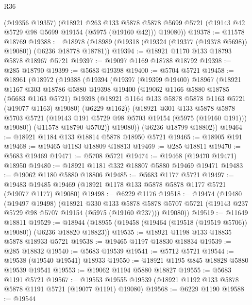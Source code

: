 \begin{lexlean}{R36}
\begin{coremodule}
      (@19356 @19357)
      (@18921
        @263
        @133
        @5878
        @5878
        @5699
        @5721
        (@19143 @42 @5729 @98 @5699 @19154 (@5975 (@19160 @42)))
        @19080))
@19378 := @11578 @18769
@19388 := @18978 (@18989 (@19318 (@19324 (@19377 (@19378 @5698)) @19080)) (@6236 @18778 @18781))
@19394 := @18921 @1170 @133 @18793 @5878 @18967 @5721
@19397 := @19097 @1169 @18788 @18792
@19398 := @285 @18790
@19399 := @5683 @19398
@19400 := @5704 @5721
@19458 := @18961
    (@18972
      (@19388
        (@19394
          (@19397
            (@19399 @19400)
            @18967
            (@18921
              @1167
              @303
              @18786
              @5880
              @19398
              @19400
              (@19062
                @1166
                @5880
                @18785
                (@5683 @1163 @5721)
                @19398
                (@18921 @1164 @133 @5878 @5878 @1163 @5721 (@19077 @1163) @19080)
                (@6229 @1162))
              (@18921
                @301
                @133
                @5878
                @5878
                @5703
                @5721
                (@19143 @191 @5729 @98 @5703 @19154 (@5975 (@19160 @191)))
                @19080))
            (@11578 @18790 @5702))
          @19080))
      (@6236 @18799 @18802))
@19464 := @18921 @1184 @133 @18814 @5878 @18950 @5721
@19465 := @18905 @191
@19468 := @19465 @1183 @18809 @18813
@19469 := @285 @18811
@19470 := @5683 @19469
@19471 := @5708 @5721
@19474 := @19468 (@19470 @19471) @18950
@19480 := @18921 @1181 @332 @18807 @5880 @19469 @19471
@19483 := @19062 @1180 @5880 @18806
@19485 := @5683 @1177 @5721
@19497 := @19483 @19485 @19469 (@18921 @1178 @133 @5878 @5878 @1177 @5721 (@19077 @1177) @19080)
@19498 := @6229 @1176
@19518 := @19474
    (@19480
      (@19497 @19498)
      (@18921
        @330
        @133
        @5878
        @5878
        @5707
        @5721
        (@19143 @237 @5729 @98 @5707 @19154 (@5975 (@19160 @237)))
        @19080))
@19519 := @11649 @18811
@19529 := @18944 (@18955 (@19458 (@19464 (@19518 (@19519 @5706)) @19080)) (@6236 @18820 @18823))
@19535 := @18921 @1198 @133 @18835 @5878 @18933 @5721
@19538 := @19465 @1197 @18830 @18834
@19539 := @285 @18832
@19540 := @5683 @19539
@19541 := @5712 @5721
@19544 := @19538 (@19540 @19541) @18933
@19550 := @18921 @1195 @845 @18828 @5880 @19539 @19541
@19553 := @19062 @1194 @5880 @18827
@19555 := @5683 @1191 @5721
@19567 := @19553 @19555 @19539 (@18921 @1192 @133 @5878 @5878 @1191 @5721 (@19077 @1191) @19080)
@19568 := @6229 @1190
@19588 := @19544

\end{coremodule}
\end{lexlean}
